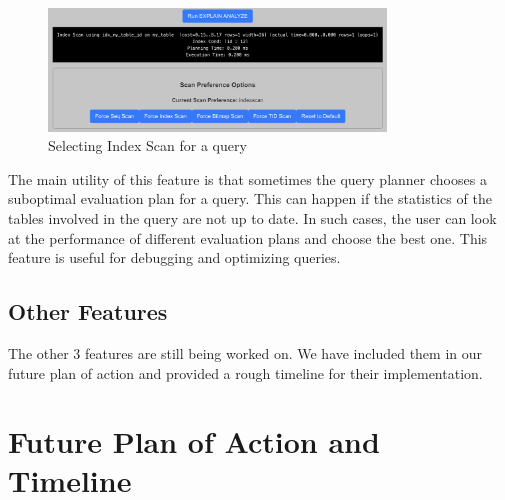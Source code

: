 \documentclass{article}
\begin{document}
\begin{figure}[htbp]
    \centering
    \includegraphics[width=0.8\textwidth]{index.png}
    \caption{Selecting Index Scan for a query}
\end{figure}

The main utility of this feature is that sometimes the query planner chooses a suboptimal evaluation plan for a query. This can happen if the statistics of the tables involved in the query are not up to date. In such cases, the user can look at the performance of different evaluation plans and choose the best one. This feature is useful for debugging and optimizing queries.


\subsection{Other Features}

The other 3 features are still being worked on. We have included them in our future plan of action and provided a rough timeline for their implementation.

\section{Future Plan of Action and Timeline}
\end{document}
